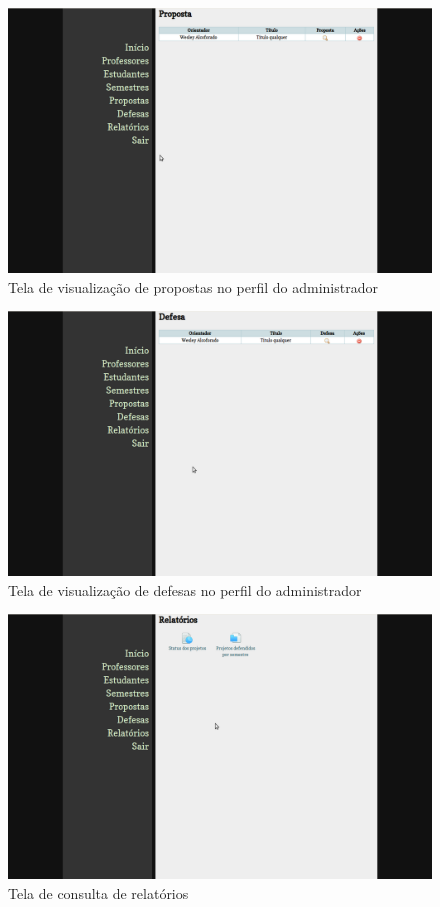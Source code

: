 \begin{figure}[htbp]
\centering
\includegraphics[width=1\textwidth]{fig/telas/administrador/propostas.png}
\caption{Tela de visualização de propostas no perfil do administrador}
\label{fig:propostas}
\end{figure}

\begin{figure}[htbp]
\centering
\includegraphics[width=1\textwidth]{fig/telas/administrador/defesas.png}
\caption{Tela de visualização de defesas no perfil do administrador}
\label{fig:defesas}
\end{figure}

\begin{figure}[htbp]
\centering
\includegraphics[width=1\textwidth]{fig/telas/administrador/relatorios.png}
\caption{Tela de consulta de relatórios}
\label{fig:relatorios}
\end{figure}

